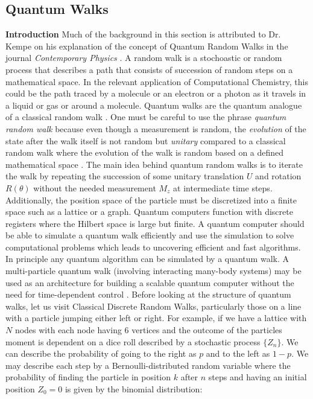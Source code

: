 \subsection{Quantum Walks}
\textbf{Introduction} \newline
Much of the background in this section is attributed to Dr. Kempe on his explanation of the concept of Quantum Random Walks in the journal \textit{Contemporary Physics }\cite{doi:10.1080/00107151031000110776}. \newline
\indent A random walk is a stochoastic or random process that describes a path that consists of succession of random steps on a mathematical space. In the relevant application of Computational Chemistry, this could be the path traced by a molecule or an electron or a photon as it travels in a liquid or gas or around a molecule. Quantum walks are the quantum analogue of a classical random walk \cite{PhysRevA.48.1687}. One must be careful to use the phrase \textit{quantum random walk} because even though a measurement is random, the \textit{evolution} of the state after the walk itself is not random but \textit{unitary} compared to a classical random walk where the evolution of the walk is random based on a defined mathematical space \cite{https://open.bu.edu/handle/2144/23564}. \newline
\indent The main idea behind quantum random walks is to iterate the walk by repeating the succession of some unitary translation $U$ and rotation $R(\theta)$ without the needed measurement $M_{z}$ at intermediate time steps. Additionally, the position space of the particle must be discretized into a finite space such as a lattice or a graph. Quantum computers function with discrete registers where the Hilbert space is large but finite. A quantum computer should be able to simulate a quantum walk efficiently and use the simulation to solve computational problems which leads to uncovering efficient and fast algorithms. In principle any quantum algorithm can be simulated by a quantum walk. A multi-particle quantum walk (involving interacting many-body systems) may be used as an architecture for building a scalable quantum computer without the need for time-dependent control \cite{Childs791}. \newline 
\indent Before looking at the structure of quantum walks, let us visit Classical Discrete Random Walks, particularly those on a line with a particle jumping either left or right. For example, if we have a lattice with $N$ nodes with each node having $6$ vertices and the outcome of the particles moment is dependent on a dice roll described by a stochastic process $\{Z_{n}\}$. We can describe the probability of going to the right as $p$ and to the left as $1-p$. We may describe each step by a Bernoulli-distributed random variable where the probability of finding the particle in position $k$ after $n$ steps and having an initial position $Z_{0}=0$ is given by the binomial distribution:
